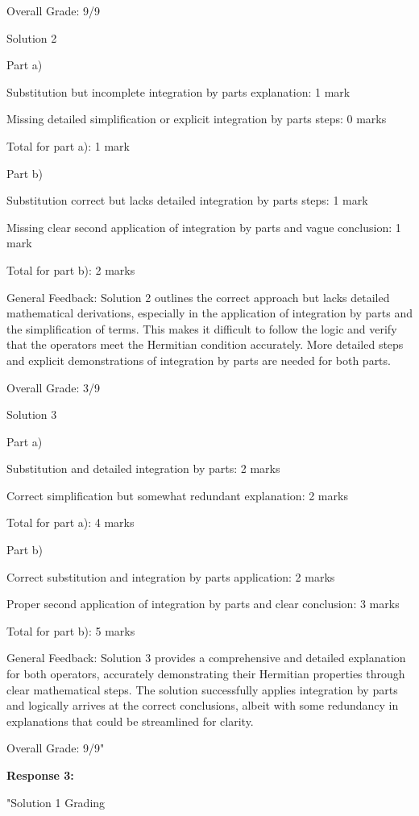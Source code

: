 \documentclass[a4paper,11pt]{article}
\begin{document}
Overall Grade: 9/9

Solution 2

Part a)

Substitution but incomplete integration by parts explanation: 1 mark

Missing detailed simplification or explicit integration by parts steps: 0 marks

Total for part a): 1 mark

Part b)

Substitution correct but lacks detailed integration by parts steps: 1 mark

Missing clear second application of integration by parts and vague conclusion: 1 mark

Total for part b): 2 marks

General Feedback: Solution 2 outlines the correct approach but lacks detailed mathematical derivations, especially in the application of integration by parts and the simplification of terms. This makes it difficult to follow the logic and verify that the operators meet the Hermitian condition accurately. More detailed steps and explicit demonstrations of integration by parts are needed for both parts.

Overall Grade: 3/9

Solution 3

Part a)

Substitution and detailed integration by parts: 2 marks

Correct simplification but somewhat redundant explanation: 2 marks

Total for part a): 4 marks

Part b)

Correct substitution and integration by parts application: 2 marks

Proper second application of integration by parts and clear conclusion: 3 marks

Total for part b): 5 marks

General Feedback: Solution 3 provides a comprehensive and detailed explanation for both operators, accurately demonstrating their Hermitian properties through clear mathematical steps. The solution successfully applies integration by parts and logically arrives at the correct conclusions, albeit with some redundancy in explanations that could be streamlined for clarity.

Overall Grade: 9/9"

\textbf{Response 3:}

"Solution 1 Grading
\end{document}
